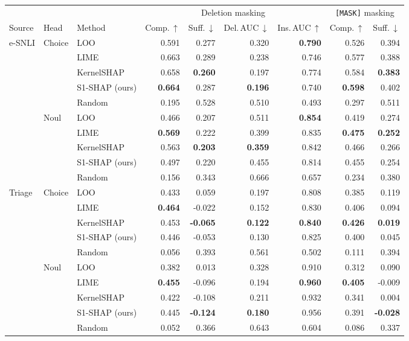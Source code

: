 \begin{tabular}{lllrrrrrr}
\toprule
 & & & \multicolumn{4}{c}{Deletion masking} & \multicolumn{2}{c}{\texttt{[MASK]} masking} \\
\cmidrule(lr){4-7}\cmidrule(lr){8-9}
Source & Head & Method & Comp.\,$\uparrow$ & Suff.\,$\downarrow$ & Del.\,AUC\,$\downarrow$ & Ins.\,AUC\,$\uparrow$ & Comp.\,$\uparrow$ & Suff.\,$\downarrow$ \\
\midrule
e-SNLI & Choice & LOO & 0.591 & 0.277 & 0.320 & \textbf{0.790} & 0.526 & 0.394 \\
 &  & LIME & 0.663 & 0.289 & 0.238 & 0.746 & 0.577 & 0.388 \\
 &  & KernelSHAP & 0.658 & \textbf{0.260} & 0.197 & 0.774 & 0.584 & \textbf{0.383} \\
 &  & S1-SHAP (ours) & \textbf{0.664} & 0.287 & \textbf{0.196} & 0.740 & \textbf{0.598} & 0.402 \\
 &  & Random & 0.195 & 0.528 & 0.510 & 0.493 & 0.297 & 0.511 \\
\cmidrule{2-9}
 & Noul & LOO & 0.466 & 0.207 & 0.511 & \textbf{0.854} & 0.419 & 0.274 \\
 &  & LIME & \textbf{0.569} & 0.222 & 0.399 & 0.835 & \textbf{0.475} & \textbf{0.252} \\
 &  & KernelSHAP & 0.563 & \textbf{0.203} & \textbf{0.359} & 0.842 & 0.466 & 0.266 \\
 &  & S1-SHAP (ours) & 0.497 & 0.220 & 0.455 & 0.814 & 0.455 & 0.254 \\
 &  & Random & 0.156 & 0.343 & 0.666 & 0.657 & 0.234 & 0.380 \\
\midrule
Triage & Choice & LOO & 0.433 & 0.059 & 0.197 & 0.808 & 0.385 & 0.119 \\
 &  & LIME & \textbf{0.464} & -0.022 & 0.152 & 0.830 & 0.406 & 0.094 \\
 &  & KernelSHAP & 0.453 & \textbf{-0.065} & \textbf{0.122} & \textbf{0.840} & \textbf{0.426} & \textbf{0.019} \\
 &  & S1-SHAP (ours) & 0.446 & -0.053 & 0.130 & 0.825 & 0.400 & 0.045 \\
 &  & Random & 0.056 & 0.393 & 0.561 & 0.502 & 0.111 & 0.394 \\
\cmidrule{2-9}
 & Noul & LOO & 0.382 & 0.013 & 0.328 & 0.910 & 0.312 & 0.090 \\
 &  & LIME & \textbf{0.455} & -0.096 & 0.194 & \textbf{0.960} & \textbf{0.405} & -0.009 \\
 &  & KernelSHAP & 0.422 & -0.108 & 0.211 & 0.932 & 0.341 & 0.004 \\
 &  & S1-SHAP (ours) & 0.445 & \textbf{-0.124} & \textbf{0.180} & 0.956 & 0.391 & \textbf{-0.028} \\
 &  & Random & 0.052 & 0.366 & 0.643 & 0.604 & 0.086 & 0.337 \\
\bottomrule
\end{tabular}
